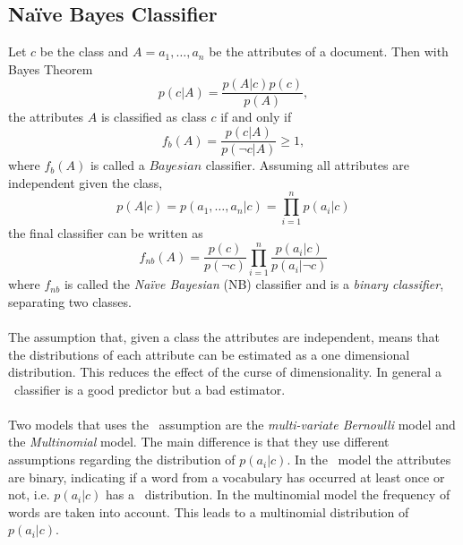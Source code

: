 \subsection{Naïve Bayes Classifier}
Let $c$ be the class and $A = a_1, \dots ,a_n$ be the attributes of a document. Then with Bayes Theorem
\begin{equation}
p(c|A)=\frac{p(A|c)p(c)}{p(A)},
\end{equation}
the attributes $A$ is classified as class $c$ if and only if
\begin{equation}
f_b(A)=\frac{p(c|A)}{p(\neg c|A)} \geq 1,
\end{equation}
where $f_b(A)$ is called a $Bayesian$ classifier. Assuming all attributes are independent given the class, 
\[
p(A|c)=p(a_1,\dots ,a_n | c) = \prod_{i=1}^n p(a_i|c)
\]
the final classifier can be written as
\begin{equation}
f_{nb}(A) = \frac{p(c)}{p(\neg c)}\prod_{i=1}^n\frac{p(a_i|c)}{p(a_i|\neg c)}
\end{equation}
where $f_{nb}$ is called the \emph{Naïve Bayesian} (NB) classifier and is a \emph{binary classifier}, separating two classes.
\\\\
The assumption that, given a class the attributes are independent, means that the distributions of each attribute can be estimated as a one dimensional distribution. This reduces the effect of the curse of dimensionality. In general a \nb\ classifier is a good predictor but a bad estimator. \cite{Zhang04optimality}
\\\\
Two models that uses the \nb\ assumption are the \emph{multi-variate Bernoulli} model and the \emph{Multinomial} model. The main difference is that they use different assumptions regarding the distribution of $p(a_i|c)$. In the \bn\ model the attributes are binary, indicating if a word from a vocabulary has occurred at least once or not, i.e. $p(a_i|c)$ has a \bn\ distribution. In the multinomial model the frequency of words are taken into account. This leads to a multinomial distribution of $p(a_i|c)$. \cite{McCallum98acomparison}\cite{bernoulliDistr}\cite{multinomialDistr}